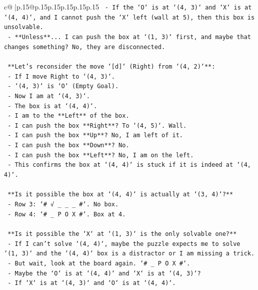 \documentclass{article}
\begin{document}
{\begin{supertabular}{c@{$\;$}|p{.15\linewidth}@{}p{.15\linewidth}p{.15\linewidth}p{.15\linewidth}p{.15\linewidth}p{.15\linewidth}}
{{{\texttt{        {-}   If the `O` is at `(4, 3)` and `X` is at `(4, 4)`, and I cannot push the `X` left (wall at 5), then this box is unsolvable.} \\
\texttt{        {-}   **Unless**... I can push the box at `(1, 3)` first, and maybe that changes something? No, they are disconnected.} \\
\\ 
\texttt{    **Let's reconsider the move `{[}d{]}` (Right) from `(4, 2)`**:} \\
\texttt{    {-}   If I move Right to `(4, 3)`.} \\
\texttt{    {-}   `(4, 3)` is `O` (Empty Goal).} \\
\texttt{    {-}   Now I am at `(4, 3)`.} \\
\texttt{    {-}   The box is at `(4, 4)`.} \\
\texttt{    {-}   I am to the **Left** of the box.} \\
\texttt{    {-}   I can push the box **Right**? To `(4, 5)`. Wall.} \\
\texttt{    {-}   I can push the box **Up**? No, I am left of it.} \\
\texttt{    {-}   I can push the box **Down**? No.} \\
\texttt{    {-}   I can push the box **Left**? No, I am on the left.} \\
\texttt{    {-}   This confirms the box at `(4, 4)` is stuck if it is indeed at `(4, 4)`.} \\
\\ 
\texttt{    **Is it possible the box at `(4, 4)` is actually at `(3, 4)`?**} \\
\texttt{    {-}   Row 3: `\# √ \_ \_ \_ \#`. No box.} \\
\texttt{    {-}   Row 4: `\# \_ P O X \#`. Box at 4.} \\
\\ 
\texttt{    **Is it possible the `X` at `(1, 3)` is the only solvable one?**} \\
\texttt{    {-}   If I can't solve `(4, 4)`, maybe the puzzle expects me to solve `(1, 3)` and the `(4, 4)` box is a distractor or I am missing a trick.} \\
\texttt{    {-}   But wait, look at the board again. `\# \_ P O X \#`.} \\
\texttt{    {-}   Maybe the `O` is at `(4, 4)` and `X` is at `(4, 3)`?} \\
\texttt{    {-}   If `X` is at `(4, 3)` and `O` is at `(4, 4)`.} \\
}}}
\end{supertabular}}
\end{document}
